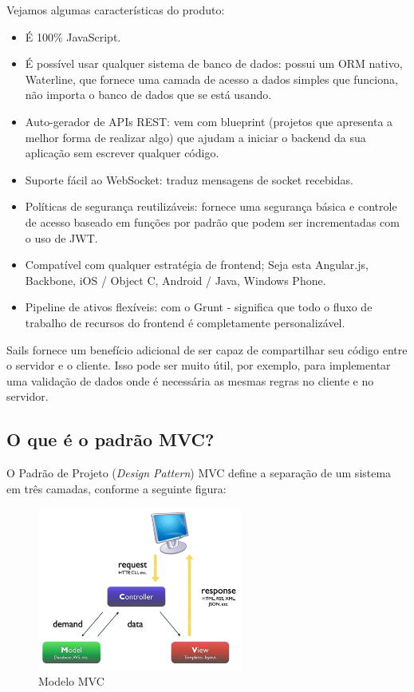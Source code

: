 \documentclass[a4paper,11pt]{article}
\begin{document}
Vejamos algumas características do produto: \vspace{-1em}
\begin{itemize}
  \item É 100\% JavaScript.
  \item É possível usar qualquer sistema de banco de dados: possui um ORM nativo, Waterline, 
  que fornece uma camada de acesso a dados simples que funciona, não importa o banco de dados 
  que se está usando.
  \item Auto-gerador de APIs REST: vem com blueprint (projetos que apresenta a melhor forma de realizar algo) que ajudam a iniciar o backend da 
  sua aplicação sem escrever qualquer código.
  \item Suporte fácil ao WebSocket: traduz mensagens de socket recebidas.
  \item Políticas de segurança reutilizáveis: fornece uma segurança básica e controle de acesso baseado em funções por padrão que podem ser incrementadas com o uso de JWT.
  \item Compatível com qualquer estratégia de frontend; Seja esta Angular.js, Backbone, iOS / Object C, Android / Java, Windows Phone.
  \item Pipeline de ativos flexíveis: com o Grunt - significa que todo o fluxo de trabalho de recursos do frontend é completamente personalizável.
\end{itemize}

Sails fornece um benefício adicional de ser capaz de compartilhar seu código entre o servidor e o cliente. Isso pode ser muito útil, por exemplo, para implementar uma validação de dados onde é necessária as mesmas regras no cliente e no servidor.

\subsection{O que é o padrão MVC?}
O Padrão de Projeto (\textit{Design Pattern}) MVC define a separação de um sistema em três camadas, conforme a seguinte figura:
\begin{figure}[H]
	\centering
	\includegraphics[width=0.6\textwidth]{imagens/mvc.png}
	\caption{Modelo MVC}
\end{figure}
\end{document}
